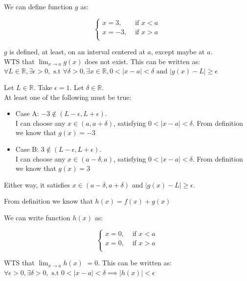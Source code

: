 \documentclass[12pt]{exam}
\newcommand {\DS} [1] {${\displaystyle #1}$}
\newcommand{\vv}{\vspace{.2cm}}
\newcommand{\R}{\mathbb{R}}
\begin{document}
\begin{enumerate}
We can define function $g$ as: 

$$
\begin{cases}
	x = 3, &\text{ if }x < a\\
	x = -3, &\text{ if } x > a\\
\end{cases}
$$

$g$ is defined, at least, on an interval centered at $a$, except maybe at $a$.\\

WTS that \DS{\lim_{x \to a} g(x)} does not exist.
This can be written as: $\forall L \in \R, \exists \epsilon > 0, \mbox{ s.t } \forall \delta > 0, \exists x \in \R,
 0 < |x - a| < \delta \mbox{ and } |g(x) - L| \geq \epsilon$

Let $L \in \R$. Take $\epsilon = 1$. Let $\delta \in \R$. \\
At least one of the following must be true:

\begin{itemize}
	\item Case A: $-3 \notin (L - \epsilon, L + \epsilon).$ \\ 
	I can choose any $x \in (a, a + \delta)$, satisfying $0 < |x - a| < \delta$. 
	From definition we know that $g(x) = -3$
\end{itemize}

\begin{itemize}
	\item Case B: $3 \notin (L - \epsilon, L + \epsilon).$ \\ 
	I can choose any $x \in (a - \delta, a )$, satisfying $0 < |x - a| < \delta$. 
	From definition we know that $g(x) = 3$
\end{itemize}

Either way, it satisfies $x \in (a - \delta, a + \delta)$ and $|g(x) - L| \geq \epsilon$. \\

\vv

From definition we know that $h(x) = f(x) + g(x)$

We can write function $h(x)$ as:

$$
\begin{cases}
	x = 0, &\text{ if }x < a\\
	x = 0, &\text{ if } x > a\\
\end{cases}
$$

WTS that \DS{\lim_{x \to a} h(x)} $= 0$. This can be written as: $\forall \epsilon > 0, \exists \delta > 0, \mbox{ s.t }
 0 < |x - a| < \delta \implies |h(x)| < \epsilon$
 

\end{enumerate}
\end{document}
